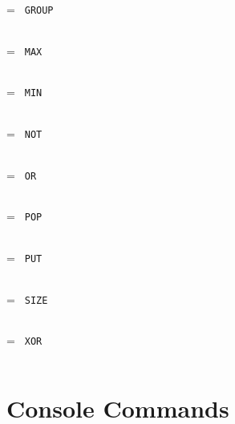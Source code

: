 \breakline

\noindent \hangindent=\parindent
\texttt{ GROUP }\\
\begin{tabular}{@{}ll}
\end{tabular}

\breakline

\noindent \hangindent=\parindent
\texttt{ MAX }\\
\begin{tabular}{@{}ll}
\end{tabular}

\breakline

\noindent \hangindent=\parindent
\texttt{ MIN }\\
\begin{tabular}{@{}ll}
\end{tabular}

\breakline

\noindent \hangindent=\parindent
\texttt{ NOT }\\
\begin{tabular}{@{}ll}
\end{tabular}

\breakline

\noindent \hangindent=\parindent
\texttt{ OR }\\
\begin{tabular}{@{}ll}
\end{tabular}

\breakline

\noindent \hangindent=\parindent
\texttt{ POP }\\
\begin{tabular}{@{}ll}
\end{tabular}

\breakline

\noindent \hangindent=\parindent
\texttt{ PUT }\\
\begin{tabular}{@{}ll}
\end{tabular}

\breakline

\noindent \hangindent=\parindent
\texttt{ SIZE }\\
\begin{tabular}{@{}ll}
\end{tabular}

\breakline

\noindent \hangindent=\parindent
\texttt{ XOR }\\
\begin{tabular}{@{}ll}
\end{tabular}

\breakline


\section{Console Commands}
\label{consoleDommands}

